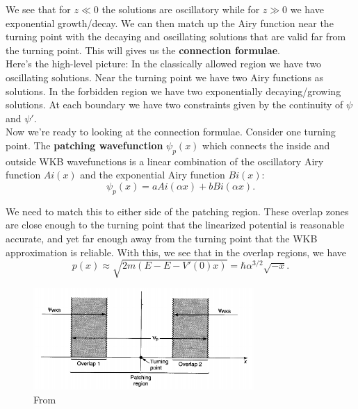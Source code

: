 \documentclass{book}
\theoremstyle{definition}
\newcommand{\al}{\alpha}
\begin{document}
We see that for $z\ll 0$ the solutions are oscillatory while for $z\gg 0$ we have exponential growth/decay. We can then match up the Airy function near the turning point with the decaying and oscillating
solutions that are valid far from the turning point. This will gives us the \textbf{connection formulae}. \\


Here's the high-level picture: In the classically allowed region we have two oscillating solutions. Near the turning point we have two Airy functions as solutions. In the forbidden region we have two exponentially decaying/growing solutions. At each boundary we have two constraints given by the continuity of $\psi$ and $\psi'$. \\


Now we're ready to looking at the  connection formulae. Consider one turning point. The \textbf{patching wavefunction} $\psi_p(x)$ which connects the inside and outside WKB wavefunctions  is a linear combination of the oscillatory Airy function $Ai(x)$ and the exponential Airy function $Bi(x)$:
\begin{equation*}
\psi_p(x) = a Ai(\al x) + b Bi(\al x).
\end{equation*}

We need to match this to either side of the patching region. These overlap zones are close enough to the turning point that the linearized potential is reasonable accurate, and yet far enough away from the turning point that the WKB approximation is reliable. With this, we see that in the overlap regions, we have 
\begin{equation*}
p(x) \approx \sqrt{2m(E-E-V'(0)x)} = \hbar \al^{3/2}\sqrt{-x}.
\end{equation*}


\begin{figure}[!htb]
	\centering
	\includegraphics[width=0.75\textwidth]{images/wkb_3}
	\caption{From \cite{griffiths2018introduction}}
\end{figure}
\end{document}

